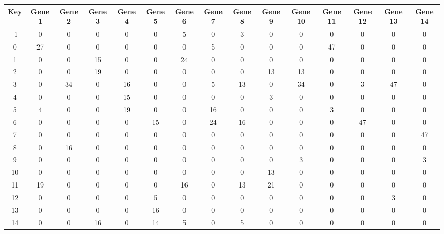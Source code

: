 \begin{tabular}{|c|c|c|c|c|c|c|c|c|c|c|c|c|c|c|}
\hline
Key & Gene 1 & Gene 2 & Gene 3 & Gene 4 & Gene 5 & Gene 6 & Gene 7 & Gene 8 & Gene 9 & Gene 10 & Gene 11 & Gene 12 & Gene 13 & Gene 14 \\
\hline
-1 & 0 & 0 & 0 & 0 & 0 & 5 & 0 & 3 & 0 & 0 & 0 & 0 & 0 & 0 \\
0 & 27 & 0 & 0 & 0 & 0 & 0 & 5 & 0 & 0 & 0 & 47 & 0 & 0 & 0 \\
1 & 0 & 0 & 15 & 0 & 0 & 24 & 0 & 0 & 0 & 0 & 0 & 0 & 0 & 0 \\
2 & 0 & 0 & 19 & 0 & 0 & 0 & 0 & 0 & 13 & 13 & 0 & 0 & 0 & 0 \\
3 & 0 & 34 & 0 & 16 & 0 & 0 & 5 & 13 & 0 & 34 & 0 & 3 & 47 & 0 \\
4 & 0 & 0 & 0 & 15 & 0 & 0 & 0 & 0 & 3 & 0 & 0 & 0 & 0 & 0 \\
5 & 4 & 0 & 0 & 19 & 0 & 0 & 16 & 0 & 0 & 0 & 3 & 0 & 0 & 0 \\
6 & 0 & 0 & 0 & 0 & 15 & 0 & 24 & 16 & 0 & 0 & 0 & 47 & 0 & 0 \\
7 & 0 & 0 & 0 & 0 & 0 & 0 & 0 & 0 & 0 & 0 & 0 & 0 & 0 & 47 \\
8 & 0 & 16 & 0 & 0 & 0 & 0 & 0 & 0 & 0 & 0 & 0 & 0 & 0 & 0 \\
9 & 0 & 0 & 0 & 0 & 0 & 0 & 0 & 0 & 0 & 3 & 0 & 0 & 0 & 3 \\
10 & 0 & 0 & 0 & 0 & 0 & 0 & 0 & 0 & 13 & 0 & 0 & 0 & 0 & 0 \\
11 & 19 & 0 & 0 & 0 & 0 & 16 & 0 & 13 & 21 & 0 & 0 & 0 & 0 & 0 \\
12 & 0 & 0 & 0 & 0 & 5 & 0 & 0 & 0 & 0 & 0 & 0 & 0 & 3 & 0 \\
13 & 0 & 0 & 0 & 0 & 16 & 0 & 0 & 0 & 0 & 0 & 0 & 0 & 0 & 0 \\
14 & 0 & 0 & 16 & 0 & 14 & 5 & 0 & 5 & 0 & 0 & 0 & 0 & 0 & 0 \\
\hline
\end{tabular}